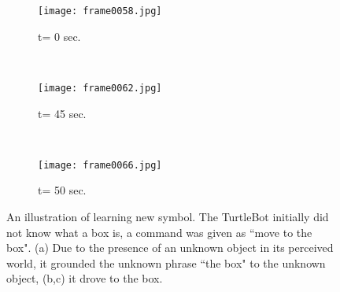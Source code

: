 

\begin{figure}[htb!]
\begin{subfigure}[b]{0.305\columnwidth}
\centering
\texttt{[image: frame0058.jpg]}
\caption{t= 0 sec.}
\label{fig:exp_new_1}
\end{subfigure}
~
\begin{subfigure}[b]{0.31\columnwidth}
\centering
\texttt{[image: frame0062.jpg]}
\caption{t= 45 sec.}
\label{fig:exp_new_2}
\end{subfigure}
~
\begin{subfigure}[b]{0.315\columnwidth}
\centering
\texttt{[image: frame0066.jpg]}
\caption{t= 50 sec.}
\label{fig:exp_new_3}
\end{subfigure}
\caption{An illustration of learning new symbol. The TurtleBot initially did not know what a box is, a command was given as ``move to the box". (a) Due to the presence of an unknown object in its perceived world, it grounded the unknown phrase ``the box" to the unknown object, (b,c) it drove to the box.}
\label{fig:cone}
\end{figure}




